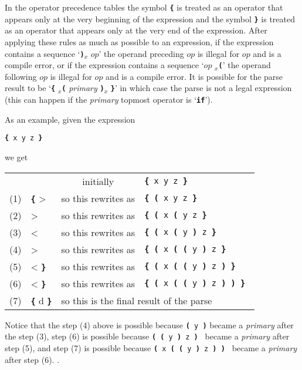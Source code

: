 \documentclass[12pt]{article}
\newcommand{\TT}[1]{{\tt \bfseries #1}}
\begin{document}
In the operator precedence tables the symbol \TT{\{} is treated as an
operator that appears only at the very beginning of the expression
and the symbol \TT{\}} is treated as an operator that appears only at
the very end of the expression.  After applying these rules as much
as possible to an expression,
if the expression contains a sequence `\TT{)}$\!_x$ $op$' the operand
preceding $op$ is illegal for $op$ and is a compile error, or
if the expression contains a sequence `$op$ $_x\!$\TT{(}' the operand
following $op$ is illegal for $op$ and is a compile error.
It is possible for the parse result to be
`\TT{\{} $_x\!$\TT{(} {\em primary} \TT{)}$\!_x$ \TT{\}}' in which case
the parse is not a legal expression (this can happen if the {\em primary}
topmost operator is `\TT{if}').

As an example, given the expression
\begin{center}
\tt \TT{\{}  x \IX{+} \RX{+} y \IX{*} z \TT{\}}
\end{center}
we get
\begin{center}
\begin{tabular}{llcl}
    & & initially & \tt \TT{\{} x \IX{+} \RX{+} y \IX{*} z \TT{\}} \\
(1) &
\TT{\{} > \IX{+}
    & so this rewrites as
    & \tt \TT{\{} \TT{(} x \IX{+} \RX{+} y \IX{*} z \TT{\}}\\
(2) &
\IX{+} > \RX{+}
    & so this rewrites as
    & \tt \TT{\{} \TT{(} x \IX{+} \TT{(} \RX{+} y \IX{*} z \TT{\}} \\
(3) &
\RX{+} < \IX{*}
    & so this rewrites as
    & \tt \TT{\{} \TT{(} x \IX{+} \TT{(} \RX{+} y \TT{)} \IX{*} z \TT{\}} \\
(4) &
\IX{+} > \IX{*}
    & so this rewrites as
    & \tt \TT{\{} \TT{(} x \IX{+} \TT{(} \TT{(} \RX{+} y \TT{)} \IX{*} z
          \TT{\}} \\
(5) &
\IX{*} < \TT{\}}
    & so this rewrites as
    & \tt \TT{\{} \TT{(} x \IX{+} \TT{(} \TT{(} \RX{+} y \TT{)} \IX{*} z
          \TT{)} \TT{\}} \\
(6) &
\IX{+} < \TT{\}}
    & so this rewrites as
    & \tt \TT{\{} \TT{(} x \IX{+} \TT{(} \TT{(} \RX{+} y \TT{)} \IX{*} z
          \TT{)} \TT{)} \TT{\}} \\
(7) &
\TT{\{} d \TT{\}}
    & \multicolumn{2}{l}{so this is the final result of the parse}
\end{tabular}
\end{center}

Notice that the step (4) above is possible because
{\tt \TT{(} \RX{+} y \TT{)}} became a {\em primary} after
the step (3),
step (6) is possible because
{\tt \TT{(} \TT{(} \RX{+} y \TT{)} \IX{*} z \TT{)} }
became a {\em primary} after step (5),
and step (7) is possible because
{ \tt \TT{(} x \IX{+} \TT{(} \TT{(} \RX{+} y \TT{)} \IX{*} z \TT{)} \TT{)} }
became a {\em primary} after step (6).
.
\end{document}
